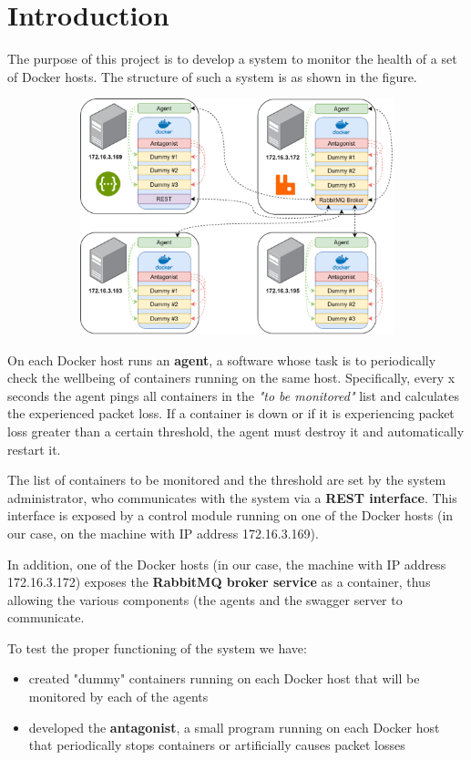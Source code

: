 \section{Introduction}
The purpose of this project is to develop a system to monitor the health of a set of Docker hosts. The structure of such a system is as shown in the figure. 

\begin{figure}[H]
	\begin{subfigure}{\textwidth}
	\centering
		\includegraphics[width=0.9\linewidth]{img/structure.png} 
	\end{subfigure}
\end{figure}

On each Docker host runs an \textbf{agent}, a software whose task is to periodically check the wellbeing of containers running on the same host. Specifically, every x seconds the agent pings all containers in the \textit{"to be monitored"} list and calculates the experienced packet loss. If a container is down or if it is experiencing packet loss greater than a certain threshold, the agent must destroy it and automatically restart it. 

The list of containers to be monitored and the threshold are set by the system administrator, who communicates with the system via a \textbf{REST interface}. This interface is exposed by a control module running on one of the Docker hosts (in our case, on the machine with IP address 172.16.3.169).

In addition, one of the Docker hosts (in our case, the machine with IP address 172.16.3.172) exposes the \textbf{RabbitMQ broker service} as a container, thus allowing the various components (the agents and the swagger server to communicate.

To test the proper functioning of the system we have:
\begin{itemize}
	\item created "dummy" containers running on each Docker host that will be monitored by each of the agents 
	\item developed the \textbf{antagonist}, a small program running on each Docker host that periodically stops containers or artificially causes packet losses 
\end{itemize}